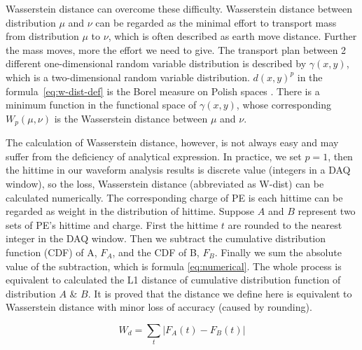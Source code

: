 Wasserstein distance can overcome these difficulty. Wasserstein distance between distribution $\mu$ and $\nu$ can be regarded as the minimal effort to transport mass from distribution $\mu$ to $\nu$, which is often described as earth move distance. Further the mass moves, more the effort we need to give. The transport plan between 2 different one-dimensional random variable distribution is described by $\gamma(x, y)$, which is a two-dimensional random variable distribution. $d(x,y)^{p}$ in the formula~\eqref{eq:w-dist-def} is the Borel measure on Polish spaces \cite{villani_2009}. There is a minimum function in the functional space of $\gamma(x, y)$, whose corresponding $W_{p}(\mu,\nu)$ is the Wasserstein distance between $\mu$ and $\nu$. 

The calculation of Wasserstein distance, however, is not always easy and may suffer from the deficiency of analytical expression. In practice, we set $p=1$, then the hittime in our waveform analysis results is discrete value (integers in a DAQ window), so the loss, Wasserstein distance (abbreviated as W-dist) can be calculated numerically. The corresponding charge of PE is each hittime can be regarded as weight in the distribution of hittime. Suppose $A$ and $B$ represent two sets of PE's hittime and charge. First the hittime $t$ are rounded to the nearest integer in the DAQ window. Then we subtract the cumulative distribution function (CDF) of A, $F_{A}$, and the CDF of B, $F_{B}$. Finally we sum the absolute value of the subtraction, which is formula \eqref{eq:numerical}. The whole process is equivalent to calculated the L1 distance of cumulative distribution function of distribution $A$ \& $B$. It is proved that the distance we define here is equivalent to Wasserstein distance with minor loss of accuracy (caused by rounding). 

\begin{equation}
    W_{d} = \sum_t|F_{A}(t) - F_{B}(t)|
    \label{eq:numerical}
\end{equation}